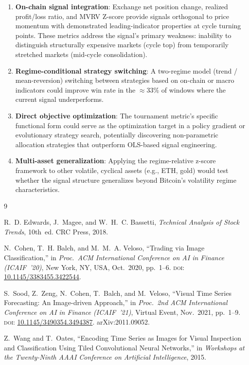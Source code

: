 \documentclass[11pt,letterpaper]{article}
\begin{document}
\begin{enumerate}
  \item \textbf{On-chain signal integration}: Exchange net position change,
    realized profit/loss ratio, and MVRV Z-score provide signals orthogonal to
    price momentum with demonstrated leading-indicator properties at cycle turning
    points.  These metrics address the signal's primary weakness: inability to
    distinguish structurally expensive markets (cycle top) from temporarily
    stretched markets (mid-cycle consolidation).

  \item \textbf{Regime-conditional strategy switching}: A two-regime model
    (trend / mean-reversion) switching between strategies based on on-chain or
    macro indicators could improve win rate in the $\approx33\%$ of windows
    where the current signal underperforms.

  \item \textbf{Direct objective optimization}: The tournament metric's specific
    functional form could serve as the optimization target in a policy gradient
    or evolutionary strategy search, potentially discovering non-parametric
    allocation strategies that outperform OLS-based signal engineering.

  \item \textbf{Multi-asset generalization}: Applying the regime-relative
    z-score framework to other volatile, cyclical assets (e.g., ETH, gold) would
    test whether the signal structure generalizes beyond Bitcoin's volatility
    regime characteristics.
\end{enumerate}


\begin{thebibliography}{9}

R.~D. Edwards, J.~Magee, and W.~H.~C. Bassetti,
\emph{Technical Analysis of Stock Trends}, 10th~ed.
CRC Press, 2018.

N.~Cohen, T.~H. Balch, and M.~M.~A. Veloso,
``Trading via Image Classification,''
in \emph{Proc.\ ACM International Conference on AI in Finance (ICAIF~'20)},
New York, NY, USA, Oct.\ 2020, pp.\ 1--6.
\newblock \textsc{doi}: \href{https://doi.org/10.1145/3383455.3422544}{10.1145/3383455.3422544}.

S.~Sood, Z.~Zeng, N.~Cohen, T.~Balch, and M.~Veloso,
``Visual Time Series Forecasting: An Image-driven Approach,''
in \emph{Proc.\ 2nd ACM International Conference on AI in Finance (ICAIF~'21)},
Virtual Event, Nov.\ 2021, pp.\ 1--9.
\newblock \textsc{doi}: \href{https://doi.org/10.1145/3490354.3494387}{10.1145/3490354.3494387}.
arXiv:2011.09052.

Z.~Wang and T.~Oates,
``Encoding Time Series as Images for Visual Inspection and Classification
Using Tiled Convolutional Neural Networks,''
in \emph{Workshops at the Twenty-Ninth AAAI Conference on Artificial
Intelligence}, 2015.

\end{thebibliography}
\end{document}
